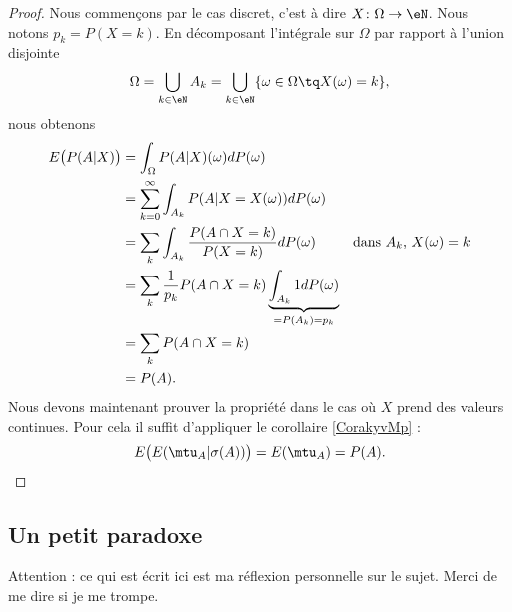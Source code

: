 \begin{proof}
    Nous commençons par le cas discret, c'est à dire \( X\colon \Omega\to \eN\). Nous notons \( p_k=P(X=k)\). En décomposant l'intégrale sur \( \Omega\) par rapport à l'union disjointe
    \begin{equation}
        \Omega=\bigcup_{k\in \eN}A_k=\bigcup_{k\in \eN}\{ \omega\in\Omega \tq X(\omega)=k\},
    \end{equation}
    nous obtenons
    \begin{subequations}
        \begin{align}
            E\big( P(A|X) \big)&=\int_{\Omega}P(A|X)(\omega)dP(\omega)\\
            &=\sum_{k=0}^{\infty}\int_{A_k}P(A|X=X(\omega))dP(\omega)\\
            &=\sum_k\int_{A_k}\frac{ P(A\cap X=k) }{ P(X=k) }dP(\omega) & \text{dans \( A_k\), \( X(\omega)=k\)}\\
            &=\sum_k\frac{1}{ p_k }P(A\cap X=k)\underbrace{\int_{A_k}1dP(\omega)}_{=P(A_k)=p_k}\\
            &=\sum_{k}P(A\cap X=k)\\
            &=P(A).
        \end{align}
    \end{subequations}
    Nous devons maintenant prouver la propriété dans le cas où \( X\) prend des valeurs continues. Pour cela il suffit d'appliquer le corollaire \ref{CorakyvMp} :
    \begin{equation}
        E\big( E(\mtu_A|\sigma(A)) \big)=E(\mtu_A)=P(A).
    \end{equation}
\end{proof}

\subsection{Un petit paradoxe}
\label{subSecGXVYooTDdZaB}

Attention : ce qui est écrit ici est ma réflexion personnelle sur le sujet. Merci de me dire si je me trompe.

